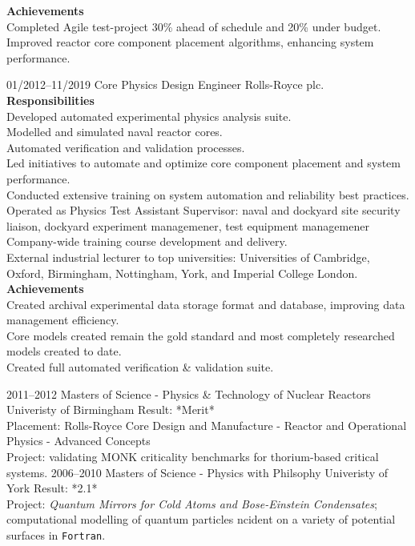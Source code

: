 \documentclass[8pt]{developercv}
\begin{document}
\begin{entrylist}
{		\textbf{Achievements}\\
		Completed Agile test-project 30\% ahead of schedule and 20\% under budget.\\
		Improved reactor core component placement algorithms, enhancing system
		performance.\\
	}

	\entry
	{01/2012--11/2019}
	{Core Physics Design Engineer}
	{Rolls-Royce plc.}
	{
		\textbf{Responsibilities}\\
		Developed automated experimental physics analysis suite.\\
		Modelled and simulated naval reactor cores.\\
		Automated verification and validation processes.\\
		Led initiatives to automate and optimize core component placement and system
		performance.\\
		Conducted extensive training on system automation and reliability best
		practices.\\
		Operated as Physics Test Assistant Supervisor: naval and dockyard site
		security liaison, dockyard experiment managemener, test equipment
		managemener\\
		Company-wide training course development and delivery.\\
		External industrial lecturer to top universities: Universities of Cambridge, Oxford,
		Birmingham, Nottingham, York, and Imperial College London.\\

		\textbf{Achievements}\\
		Created archival experimental data storage format and database, improving
		data management efficiency.\\
		Core models created remain the gold standard and most completely researched
		models created to date.\\
		Created full automated verification \& validation suite.
	}
\end{entrylist}


\begin{entrylist}
	\entry
	{2011--2012}
	{Masters of Science - Physics \& Technology of Nuclear Reactors}
	{Univeristy of Birmingham}
	{
		Result: *Merit*\\
		Placement: Rolls-Royce Core Design and Manufacture - Reactor
		and Operational Physics - Advanced Concepts\\
		Project: validating MONK criticality benchmarks for thorium-based critical
		systems.
	}
	\entry
	{2006--2010}
	{Masters of Science - Physics with Philsophy}
	{Univeristy of York}
	{
		Result: *2.1*\\
		Project: \textit{Quantum Mirrors for Cold Atoms and
			Bose-Einstein Condensates}; computational modelling of quantum particles
		ncident on a variety of potential surfaces in \texttt{Fortran}.
	}
\end{entrylist}
\end{document}
